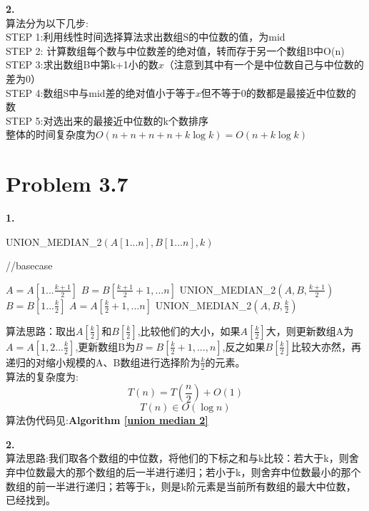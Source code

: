 \documentclass[twocolumn]{ctexart}
\begin{document}
\noindent \textbf{2.}\\
\indent 
算法分为以下几步:\\
	STEP 1:利用线性时间选择算法求出数组S的中位数的值，为mid\\
	STEP 2: 计算数组每个数与中位数差的绝对值，转而存于另一个数组B中O(n)\\
	STEP 3:求出数组B中第k+1小的数$x$（注意到其中有一个是中位数自己与中位数的差为0）\\
	STEP 4:数组S中与mid差的绝对值小于等于$x$但不等于0的数都是最接近中位数的数\\
	STEP 5:对选出来的最接近中位数的k个数排序\\
整体的时间复杂度为$O(n+n+n+n+k\log{k})=O(n+k\log{k})$

\section*{Problem 3.7}
\noindent \textbf{1.}\\

	\begin{algorithm}[htbp]
		\caption{UNION\_MEDIAN\_2$(A[1...n],B[1...n],k)$}
		\label{union median 2}
		\begin{algorithmic}[1]
			\STATE //basecase
			\ENDIF
			
				\STATE $A=A[1...\frac{k+1}{2}]$
				\STATE $B=B[\frac{k+1}{2}+1,...n]$
				\STATE UNION\_MEDIAN\_2$(A,B,\frac{k+1}{2})$
				\STATE $B=B[1...\frac{k}{2}]$
				\STATE $A=A[\frac{k}{2}+1,...n]$	
				\STATE UNION\_MEDIAN\_2$(A,B,\frac{k}{2})$
			\ELSE
			\ENDIF
		\end{algorithmic}
	\end{algorithm}






\indent 算法思路：取出$A[\frac{k}{2}]$和$B[\frac{k}{2}]$,比较他们的大小，如果$A[\frac{k}{2}]$大，则更新数组A为$A=A[1,2...\frac{k}{2}]$,更新数组B为$B=B[\frac{k}{2}+1,...,n]$,反之如果$B[\frac{k}{2}]$比较大亦然，再递归的对缩小规模的A、B数组进行选择阶为$\frac{k}{2}$的元素。\\
\indent 算法的复杂度为:
\[
	T(n)=T(\frac{n}{2})+O(1)
\]
\[
	T(n)\in O(\log{n})
\]
\indent 算法伪代码见:\textbf{Algorithm \ref{union median 2}}

\noindent \textbf{2.}\\
算法思路:我们取各个数组的中位数，将他们的下标之和与k比较：若大于k，则舍弃中位数最大的那个数组的后一半进行递归；若小于k，则舍弃中位数最小的那个数组的前一半进行递归；若等于k，则是k阶元素是当前所有数组的最大中位数，已经找到。\\
\end{document}
